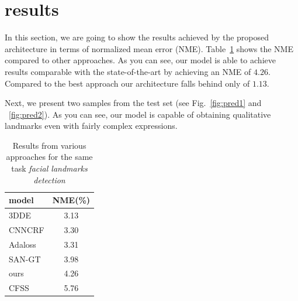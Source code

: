 \section{results}\label{sect:result}
In this section, we are going to show the results achieved by the proposed architecture in terms of normalized mean error (NME).
Table~\ref{table:results} shows the NME compared to other approaches. As you can see, our model is able to achieve results comparable with the state-of-the-art by achieving an NME of $4.26$. Compared to the best approach our architecture falls behind only of $1.13$. 

Next, we present two samples from the test set (see Fig.~\ref{fig:pred1} and ~\ref{fig:pred2}). As you can see, our model is capable of obtaining qualitative landmarks even with fairly complex expressions. 

\begin{table}[h]\centering
    \begin{tabular}{lc}
        \toprule
        model & NME(\%) \\\midrule
        3DDE\cite{Valle19} & 3.13 \\
        CNNCRF\cite{Chen19} & 3.30 \\
        Adaloss\cite{Teixeira19} & 3.31 \\
        SAN-GT\cite{Dong18} & 3.98 \\
        ours & 4.26 \\
        CFSS\cite{Zhu16} & 5.76 \\
        \bottomrule
    \end{tabular}
    \caption{Results from various approaches for the same task \textit{facial landmarks detection}}
    \label{table:results}
\end{table}


